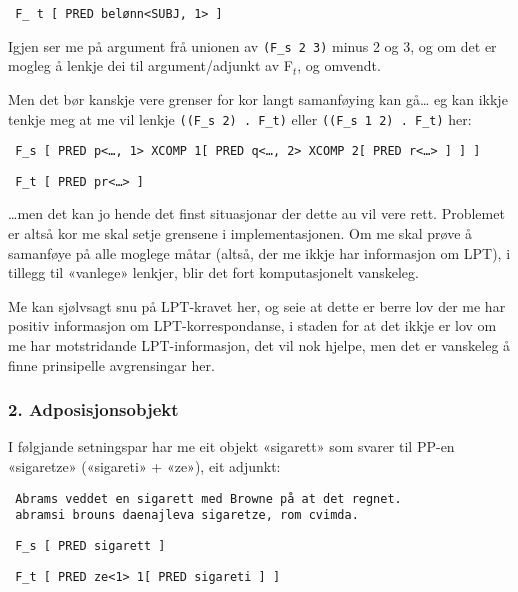 \documentclass[11pt,a4paper,oneside,draft]{book}
\begin{document}
\begin{verbatim}
 F_ t [ PRED belønn<SUBJ, 1> ]
\end{verbatim}


Igjen ser me på argument frå unionen av \texttt{(F\_s 2 3)} minus 2 og 3, og
om det er mogleg å lenkje dei til argument/adjunkt av F$_t$, og omvendt.

Men det bør kanskje vere grenser for kor langt samanføying kan gå… eg
kan ikkje tenkje meg at me vil lenkje \texttt{((F\_s 2) . F\_t)} eller \texttt{((F\_s 1 2) . F\_t)} her:

\begin{verbatim}
 F_s [ PRED p<…, 1> XCOMP 1[ PRED q<…, 2> XCOMP 2[ PRED r<…> ] ] ]
\end{verbatim}


\begin{verbatim}
 F_t [ PRED pr<…> ]
\end{verbatim}


\ldots{}men det kan jo hende det finst situasjonar der dette au vil vere
rett. Problemet er altså kor me skal setje grensene i
implementasjonen. Om me skal prøve å samanføye på alle moglege måtar
(altså, der me ikkje har informasjon om LPT), i tillegg til «vanlege»
lenkjer, blir det fort komputasjonelt vanskeleg. 

 Me kan sjølvsagt snu
på LPT-kravet her, og seie at dette er berre lov der me har positiv
informasjon om LPT-korrespondanse, i staden for at det ikkje er lov om
me har motstridande LPT-informasjon, det vil nok hjelpe, men det er
vanskeleg å finne prinsipelle avgrensingar her. 
\subsubsection{2. Adposisjonsobjekt}
\label{sec-3.6.4.2}


I følgjande setningspar har me eit objekt «sigarett» som svarer til
PP-en «sigaretze» («sigareti» + «ze»), eit adjunkt:

\begin{verbatim}
 Abrams veddet en sigarett med Browne på at det regnet.
 abramsi brouns daenajleva sigaretze, rom cvimda.
\end{verbatim}


\begin{verbatim}
 F_s [ PRED sigarett ]
\end{verbatim}


\begin{verbatim}
 F_t [ PRED ze<1> 1[ PRED sigareti ] ]
\end{verbatim}
\end{document}
